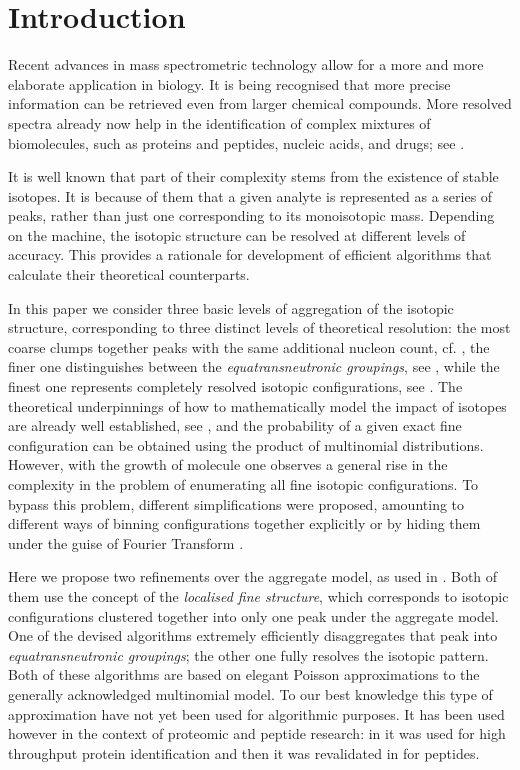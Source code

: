 \section{Introduction}

Recent advances in mass spectrometric technology allow for a more and more elaborate application in biology. It is being recognised that more precise information can be retrieved even from larger chemical compounds. More resolved spectra already now help in the identification of complex mixtures of biomolecules, such as proteins and peptides, nucleic acids, and drugs; see \cite{Milandanovic2012OnTheUtilityOfIsotopicFineStructure}. 

It is well known that part of their complexity stems from the existence of stable isotopes. It is because of them that a given analyte is represented as a series of peaks, rather than just one corresponding to its monoisotopic mass. Depending on the machine, the isotopic structure can be resolved at different levels of accuracy. This provides a rationale for development of efficient algorithms that calculate their theoretical counterparts.

In this paper we consider three basic levels of aggregation of the isotopic structure,  corresponding to three distinct levels of theoretical resolution: the most coarse clumps together peaks with the same additional nucleon count, cf. \cite{Kienitz1961MassSpectrometry}, the finer one distinguishes between the {\it equatransneutronic groupings}, see \cite{Olson2009Calculations}, while the finest one represents completely resolved isotopic configurations, see \cite{Rockwood1995Ultrahighspeed}. The theoretical underpinnings of how to mathematically model the impact of isotopes are already well established, see \cite{Valkenborg2012Isotopic}, and the probability of a given exact fine configuration can be obtained using the product of multinomial distributions. However, with the growth of molecule one observes a general rise in the complexity in the problem of enumerating all fine isotopic configurations. To bypass this problem, different simplifications were proposed, amounting to different ways of binning configurations together explicitly \cite{Claesen2012Efficient} or by hiding them under the guise of Fourier Transform \cite{Rockwood1995Relationship}. 

Here we propose two refinements over the aggregate model, as used in \cite{Claesen2012Efficient}. Both of them use the concept of the {\it localised fine structure}, which corresponds to isotopic configurations clustered together into only one peak under the aggregate model. One of the devised algorithms extremely efficiently disaggregates that peak into {\it equatransneutronic groupings}; the other one fully resolves the isotopic pattern. Both of these algorithms are based on elegant Poisson approximations to the generally acknowledged multinomial model. To our best knowledge this type of approximation have not yet been used for algorithmic purposes. It has been used however in the context of proteomic and peptide research: in \cite{Breen2000AutomaticPeak} it was used for high throughput protein identification and then it was revalidated in \cite{Valkenborg2007UsingPoisson} for peptides. 
